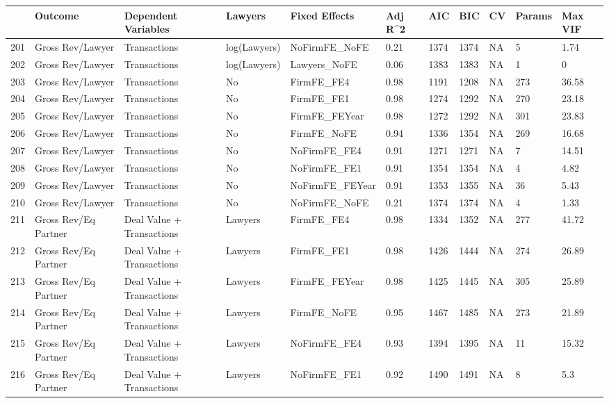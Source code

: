 \documentclass{article}
\begin{document}
\begin{table}[H]
\centering
\begin{tabular}{rllllllllll}
  \hline
 & Outcome & Dependent Variables & Lawyers & Fixed Effects & Adj R^2 & AIC & BIC & CV & Params & Max VIF \\ 
  \hline
201 & Gross Rev/Lawyer & Transactions & log(Lawyers) & NoFirmFE\_NoFE & 0.21 & 1374 & 1374 & NA & 5 & 1.74 \\ 
  202 & Gross Rev/Lawyer & Transactions & log(Lawyers) & Lawyers\_NoFE & 0.06 & 1383 & 1383 & NA & 1 & 0 \\ 
  203 & Gross Rev/Lawyer & Transactions & No & FirmFE\_FE4 & 0.98 & 1191 & 1208 & NA & 273 & 36.58 \\ 
  204 & Gross Rev/Lawyer & Transactions & No & FirmFE\_FE1 & 0.98 & 1274 & 1292 & NA & 270 & 23.18 \\ 
  205 & Gross Rev/Lawyer & Transactions & No & FirmFE\_FEYear & 0.98 & 1272 & 1292 & NA & 301 & 23.83 \\ 
  206 & Gross Rev/Lawyer & Transactions & No & FirmFE\_NoFE & 0.94 & 1336 & 1354 & NA & 269 & 16.68 \\ 
  207 & Gross Rev/Lawyer & Transactions & No & NoFirmFE\_FE4 & 0.91 & 1271 & 1271 & NA & 7 & 14.51 \\ 
  208 & Gross Rev/Lawyer & Transactions & No & NoFirmFE\_FE1 & 0.91 & 1354 & 1354 & NA & 4 & 4.82 \\ 
  209 & Gross Rev/Lawyer & Transactions & No & NoFirmFE\_FEYear & 0.91 & 1353 & 1355 & NA & 36 & 5.43 \\ 
  210 & Gross Rev/Lawyer & Transactions & No & NoFirmFE\_NoFE & 0.21 & 1374 & 1374 & NA & 4 & 1.33 \\ 
  211 & Gross Rev/Eq Partner & Deal Value + Transactions & Lawyers & FirmFE\_FE4 & 0.98 & 1334 & 1352 & NA & 277 & 41.72 \\ 
  212 & Gross Rev/Eq Partner & Deal Value + Transactions & Lawyers & FirmFE\_FE1 & 0.98 & 1426 & 1444 & NA & 274 & 26.89 \\ 
  213 & Gross Rev/Eq Partner & Deal Value + Transactions & Lawyers & FirmFE\_FEYear & 0.98 & 1425 & 1445 & NA & 305 & 25.89 \\ 
  214 & Gross Rev/Eq Partner & Deal Value + Transactions & Lawyers & FirmFE\_NoFE & 0.95 & 1467 & 1485 & NA & 273 & 21.89 \\ 
  215 & Gross Rev/Eq Partner & Deal Value + Transactions & Lawyers & NoFirmFE\_FE4 & 0.93 & 1394 & 1395 & NA & 11 & 15.32 \\ 
  216 & Gross Rev/Eq Partner & Deal Value + Transactions & Lawyers & NoFirmFE\_FE1 & 0.92 & 1490 & 1491 & NA & 8 & 5.3 \\ 

\end{tabular}
\end{table}
\end{document}
